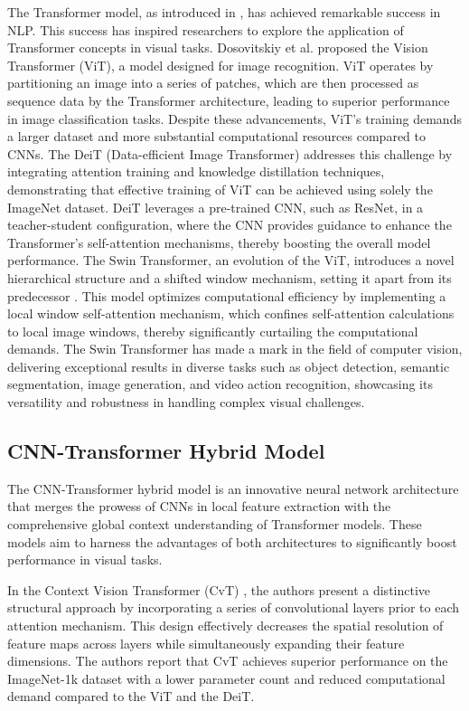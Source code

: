 The Transformer model, as introduced in \cite{vaswani2017attention}, has achieved remarkable success in NLP.
This success has inspired researchers to explore the application of Transformer concepts in visual tasks. 
Dosovitskiy et al. \cite{dosovitskiy2020image} proposed the Vision Transformer (ViT), a model designed for image recognition.
ViT operates by partitioning an image into a series of patches, which are then processed as sequence data by the Transformer architecture, leading to superior performance in image classification tasks.
Despite these advancements, ViT's training demands a larger dataset and more substantial computational resources compared to CNNs.
The DeiT (Data-efficient Image Transformer) \cite{touvron2021training} addresses this challenge by integrating attention training and knowledge distillation techniques, 
demonstrating that effective training of ViT can be achieved using solely the ImageNet dataset.
DeiT leverages a pre-trained CNN, such as ResNet, in a teacher-student configuration, where the CNN provides guidance to enhance the Transformer's self-attention mechanisms, 
thereby boosting the overall model performance.
The Swin Transformer, an evolution of the ViT, introduces a novel hierarchical structure and a shifted window mechanism, setting it apart from its predecessor \cite{liu2021swin}.
This model optimizes computational efficiency by implementing a local window self-attention mechanism, which confines self-attention calculations to local image windows, 
thereby significantly curtailing the computational demands.
The Swin Transformer has made a mark in the field of computer vision, delivering exceptional results in diverse tasks such as object detection, 
semantic segmentation, image generation, and video action recognition, showcasing its versatility and robustness in handling complex visual challenges.

\subsection{CNN-Transformer Hybrid Model}
\label{subsec:cnn_transformer_hybrid}

The CNN-Transformer hybrid model is an innovative neural network architecture that merges the prowess of CNNs in local feature extraction with the comprehensive 
global context understanding of Transformer models. These models aim to harness the advantages of both architectures to significantly boost performance in visual tasks.

In the Context Vision Transformer (CvT) \cite{hassani2021escaping}, the authors present a distinctive structural approach by incorporating a series of convolutional layers prior 
to each attention mechanism. This design effectively decreases the spatial resolution of feature maps across layers while simultaneously expanding their feature dimensions. 
The authors report that CvT achieves superior performance on the ImageNet-1k dataset with a lower parameter count and reduced computational demand compared to 
the ViT and the DeiT.

